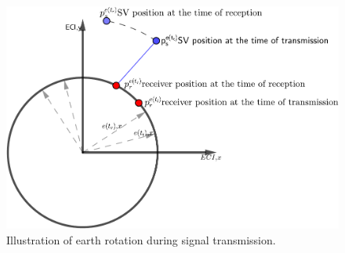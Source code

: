 \begin{figure}[!htbp]
    \centering
    \includegraphics[scale=0.75]{bilder/sagnac.pdf}%
    \caption{Illustration of earth rotation during signal transmission. }
    \label{fig:sagnac}
\end{figure}

